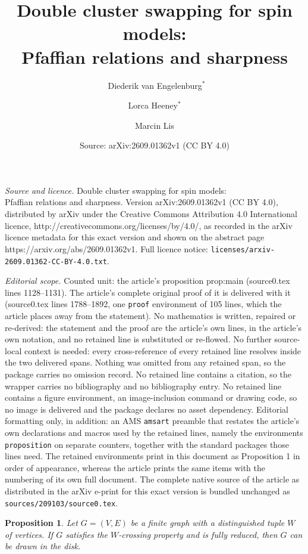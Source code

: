 \documentclass[10pt,a4paper]{amsart}
\title{{Double cluster swapping for spin models: \\Pfaffian relations and sharpness}}
\author{\ Diederik van Engelenburg$^*$ \and Lorca Heeney$^*$ \and Marcin Lis}
\date{Source: arXiv:2609.01362v1 (CC BY 4.0)}
\newtheorem{proposition}{Proposition}
\begin{document}
\maketitle

\noindent\emph{Source and licence.} {Double cluster swapping for spin models: \\Pfaffian relations and sharpness}. Version arXiv:2609.01362v1 (CC BY 4.0), distributed by arXiv under the Creative Commons Attribution 4.0 International licence, http://creativecommons.org/licenses/by/4.0/, as recorded in the arXiv licence metadata for this exact version and shown on the abstract page https://arxiv.org/abs/2609.01362v1. Full licence notice: \texttt{licenses/arxiv-2609.01362-CC-BY-4.0.txt}.\par\smallskip

\noindent\textit{Editorial scope.} Counted unit: the article's proposition prop:main (source0.tex lines 1128--1131). The article's complete original proof of it is delivered with it (source0.tex lines 1788--1892, one \texttt{proof} environment of 105 lines, which the article places away from the statement). No mathematics is written, repaired or re-derived: the statement and the proof are the article's own lines, in the article's own notation, and no retained line is substituted or re-flowed.  No further source-local context is needed: every cross-reference of every retained line resolves inside the two delivered spans.  Nothing was omitted from any retained span, so the package carries no omission record.  No retained line contains a citation, so the wrapper carries no bibliography and no bibliography entry.  No retained line contains a figure environment, an image-inclusion command or drawing code, so no image is delivered and the package declares no asset dependency.  Editorial formatting only, in addition: an AMS \texttt{amsart} preamble that restates the article's own declarations and macros used by the retained lines, namely the environments \texttt{proposition} on separate counters, together with the standard packages those lines need.  The retained environments print in this document as Proposition 1 in order of appearance, whereas the article prints the same items with the numbering of its own full document.  The complete native source of the article as distributed in the arXiv e-print for this exact version is bundled unchanged as \texttt{sources/209103/source0.tex}.
\begin{proposition} \label{prop:main}
    Let $G = (V, E)$ be a finite graph with a distinguished tuple $W$ of vertices. 
    If $G$ satisfies the $W$-crossing property and is fully reduced, then $G$ can be drawn in the disk. 
\end{proposition}
\end{document}
